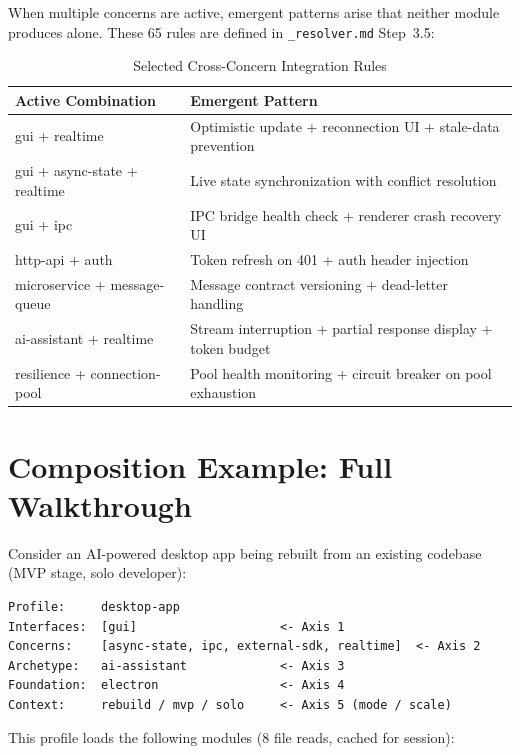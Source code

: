 \documentclass[11pt,a4paper,openright,twoside]{report}
\newcommand{\file}[1]{\texttt{#1}}
\begin{document}
When multiple concerns are active, emergent patterns arise that neither module produces alone. These 65 rules are defined in \file{\_resolver.md} Step~3.5:

\begin{table}[H]
\centering
\caption{Selected Cross-Concern Integration Rules}
\label{tab:cross-concern}
\begin{tabularx}{\textwidth}{lX}
\toprule
\textbf{Active Combination} & \textbf{Emergent Pattern} \\
\midrule
gui + realtime & Optimistic update + reconnection UI + stale-data prevention \\
gui + async-state + realtime & Live state synchronization with conflict resolution \\
gui + ipc & IPC bridge health check + renderer crash recovery UI \\
http-api + auth & Token refresh on 401 + auth header injection \\
microservice + message-queue & Message contract versioning + dead-letter handling \\
ai-assistant + realtime & Stream interruption + partial response display + token budget \\
resilience + connection-pool & Pool health monitoring + circuit breaker on pool exhaustion \\
\bottomrule
\end{tabularx}
\end{table}


\section{Composition Example: Full Walkthrough}

Consider an AI-powered desktop app being rebuilt from an existing codebase (MVP stage, solo developer):

\begin{lstlisting}[title={Domain Profile Example}]
Profile:     desktop-app
Interfaces:  [gui]                    <- Axis 1
Concerns:    [async-state, ipc, external-sdk, realtime]  <- Axis 2
Archetype:   ai-assistant             <- Axis 3
Foundation:  electron                 <- Axis 4
Context:     rebuild / mvp / solo     <- Axis 5 (mode / scale)
\end{lstlisting}

This profile loads the following modules (8 file reads, cached for session):
\end{document}
